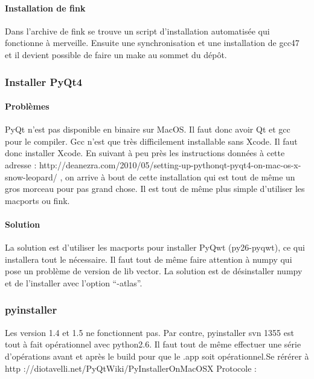 \documentclass[12pt,a4paper]{article}
\begin{document}
        \paragraph{Installation de fink}
        Dans l'archive de fink se trouve un script d'installation automatisée qui
        fonctionne à merveille. Ensuite une synchronisation et une installation de
        gcc47 et il devient possible de faire un make au sommet du dépôt.

        \subsubsection{Installer PyQt4}

        \paragraph{Problèmes}

        PyQt n'est pas disponible en binaire sur MacOS. Il faut donc avoir Qt et
        gcc pour le compiler.  Gcc n'est que très difficilement installable sans
        Xcode. Il faut donc installer Xcode.  En suivant à peu près les
        instructions données à cette adresse : \newline
        http://deanezra.com/2010/05/setting-up-pythonqt-pyqt4-on-mac-os-x-snow-leopard/\newline
        , on arrive à bout de cette installation qui est tout de même un gros
        morceau pour pas grand chose. Il est tout de même plus simple d'utiliser
        les macports ou fink.\\
    
        \paragraph{Solution}

        La solution est d'utiliser les macports pour installer PyQwt
        (py26-pyqwt), ce qui installera tout le n\'ecessaire. Il faut tout de
        même faire attention à numpy qui pose un problème de version de lib
        vector. La solution est de d\'esinstaller numpy et de l'installer avec
        l'option ``-atlas''. 

        \subsubsection{pyinstaller}

        Les version 1.4 et 1.5 ne fonctionnent pas. Par contre, pyinstaller svn
        1355 est tout à fait op\'erationnel avec python2.6. Il faut tout de même
        effectuer une s\'erie d'op\'erations avant et après le build pour que le
        .app soit op\'erationnel.Se r\'er\'erer à \newline http
        ://diotavelli.net/PyQtWiki/PyInstallerOnMacOSX \newline Protocole : \\
\end{document}
